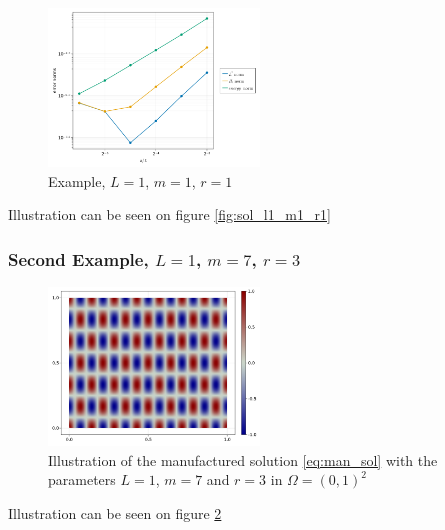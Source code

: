 \begin{figure}[tbh!]
    \centering
    \includegraphics[width=0.5\textwidth]{figures/convergence/L_1.0_m_1_r_1/conv_order_4_gamma_30.0.png}
    \caption{Example, $L=1$, $m=1$, $r=1$}
    \label{fig:ex1_sol_conv_order_2}
\end{figure}

Illustration can be seen on figure \ref{fig:sol_l1_m1_r1}

\subsubsection{Second Example, $L=1$, $m=7$, $r=3$}%
\label{sub:second_example}

\begin{figure}[tbh!]
    \centering
    \includegraphics[width=0.5\textwidth]{figures/model/l_1.0_m_7_r_3n_100_sol.png}
    \caption{Illustration of the manufactured solution \eqref{eq:man_sol}   with the parameters $L=1$, $m=7$ and $r=3$ in $\Omega = (0,1)^2$}
    \label{fig:sol_l1_m7_r3}
\end{figure}

Illustration can be seen on figure \ref{fig:sol_l1_m7_r3}

